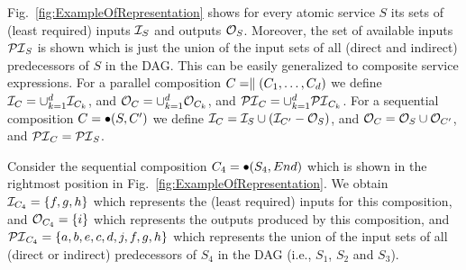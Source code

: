 Fig.~\ref{fig:ExampleOfRepresentation} shows for every atomic service $S$ its sets of (least required) inputs $\mathcal{I}_S$ and outputs $\mathcal{O}_S$. Moreover, the set of available inputs $\mathcal{PI}_S$ is shown which is just the union of the input sets of all (direct and indirect) predecessors of $S$ in the DAG.
This can be easily generalized to composite service expressions. For a parallel composition $C=\parallel(C_1,\ldots,C_d)$ we define $\mathcal{I}_C=\cup_{k=1}^d\mathcal{I}_{C_k}$, and $\mathcal{O}_C=\cup_{k=1}^d\mathcal{O}_{C_k}$, and $\mathcal{PI}_C=\cup_{k=1}^d\mathcal{PI}_{C_k}$.
For a sequential composition $C=\bullet(S,C^\prime)$ we define $\mathcal{I}_C=\mathcal{I}_S\cup(\mathcal{I}_{C^\prime}-\mathcal{O}_S)$, and $\mathcal{O}_C=\mathcal{O}_S\cup\mathcal{O}_{C^\prime}$, and $\mathcal{PI}_C=\mathcal{PI}_S$.

\begin{example}
Consider the sequential composition $C_4=\bullet(S_4, End)$ which is shown in the rightmost position in Fig.~\ref{fig:ExampleOfRepresentation}. We obtain $\mathcal{I}_{C_4}=\{f, g, h\}$ which represents the (least required) inputs for this composition, and $\mathcal{O}_{C_4}=\{i\}$ which represents the outputs produced by this composition, and $\mathcal{PI}_{C_4}=\{a, b, e, c, d, j, f, g, h\}$ which represents the union of the input sets of all (direct or indirect) predecessors of $S_4$ in the DAG (i.e., $S_1$, $S_2$ and $S_3$).
\end{example}



